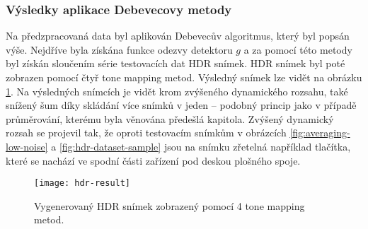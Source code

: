 \subsubsection{Výsledky aplikace Debevecovy metody}
Na předzpracovaná data byl aplikován Debevecův algoritmus, který byl popsán výše. Nejdříve byla získána funkce odezvy detektoru $g$ a za pomocí této metody byl získán sloučením série testovacích dat HDR snímek. HDR snímek byl poté zobrazen pomocí čtyř tone mapping metod. Výsledný snímek lze vidět na obrázku \ref{fig:hdr-result}. Na výsledných snímcích je vidět krom zvýšeného dynamického rozsahu, také snížený šum díky skládání více snímků v jeden -- podobný princip jako v případě průměrování, kterému byla věnována předešlá kapitola. Zvýšený dynamický rozsah se projevil tak, že oproti testovacím snímkům v obrázcích \ref{fig:averaging-low-noise} a \ref{fig:hdr-dataset-sample} jsou na snímku zřetelná například tlačítka, které se nachází ve spodní části zařízení pod deskou plošného spoje. 

\begin{figure}[htb]
\centering
\texttt{[image: hdr-result]}
\caption{Vygenerovaný HDR snímek zobrazený pomocí 4 tone mapping metod.}
\label{fig:hdr-result}
\end{figure}